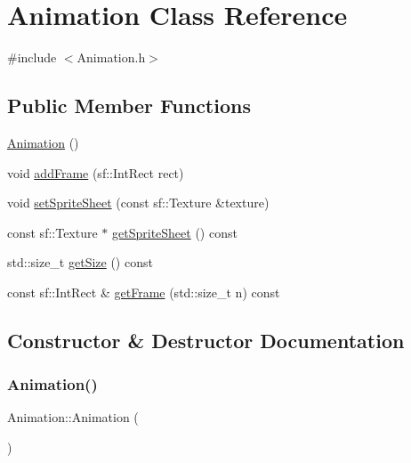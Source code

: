 \hypertarget{class_animation}{}\section{Animation Class Reference}
\label{class_animation}


{\ttfamily \#include $<$Animation.\+h$>$}

\subsection*{Public Member Functions}
\begin{DoxyCompactItemize}
\item 
\hyperlink{class_animation_a83f0a16cef7117f187ad596de38dd9d6}{Animation} ()
\item 
void \hyperlink{class_animation_a486ee5fa2d40ae90f227a19866998c91}{add\+Frame} (sf\+::\+Int\+Rect rect)
\item 
void \hyperlink{class_animation_a2fb16f452a323d51a0104c0aa454cab3}{set\+Sprite\+Sheet} (const sf\+::\+Texture \&texture)
\item 
const sf\+::\+Texture $\ast$ \hyperlink{class_animation_abf4f00f8b1657829583d7d92e71b93d1}{get\+Sprite\+Sheet} () const
\item 
std\+::size\+\_\+t \hyperlink{class_animation_ac6854dc96e9fc8ffd97feba43547c869}{get\+Size} () const
\item 
const sf\+::\+Int\+Rect \& \hyperlink{class_animation_a8cf30a3b19ba104eeb34b08f45cfabe2}{get\+Frame} (std\+::size\+\_\+t n) const
\end{DoxyCompactItemize}


\subsection{Constructor \& Destructor Documentation}
\hypertarget{class_animation_a83f0a16cef7117f187ad596de38dd9d6}{}\label{class_animation_a83f0a16cef7117f187ad596de38dd9d6} 
\subsubsection{\texorpdfstring{Animation()}{Animation()}}
{\footnotesize\ttfamily Animation\+::\+Animation (\begin{DoxyParamCaption}{ }\end{DoxyParamCaption})}



